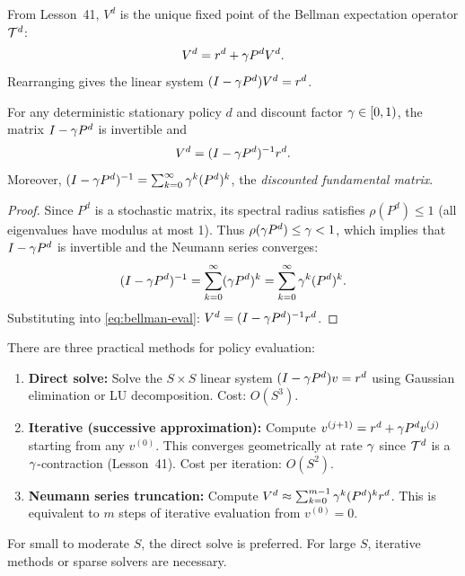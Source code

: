 \documentclass[11pt,a4paper]{article}
\begin{document}
From Lesson~41, $V^d$ is the unique fixed point of the Bellman
expectation operator $\mathcal{T}^d$:
\begin{equation}
\label{eq:bellman-eval}
    V^d = r^d + \gamma P^d V^d.
\end{equation}
Rearranging gives the linear system
$(I - \gamma P^d) V^d = r^d$.

\begin{theorem}
\label{thm:policy-eval-matrix}
For any deterministic stationary policy $d$ and discount factor
$\gamma \in [0,1)$, the matrix $I - \gamma P^d$ is invertible
and
\begin{equation}
\label{eq:policy-eval-closed}
    V^d = (I - \gamma P^d)^{-1} r^d.
\end{equation}
Moreover, $(I - \gamma P^d)^{-1} = \sum_{k=0}^\infty
\gamma^k (P^d)^k$, the \emph{discounted fundamental matrix}.
\end{theorem}

\begin{proof}
Since $P^d$ is a stochastic matrix, its spectral radius satisfies
$\rho(P^d) \leq 1$ (all eigenvalues have modulus at most 1). Thus
$\rho(\gamma P^d) \leq \gamma < 1$, which implies that
$I - \gamma P^d$ is invertible and the Neumann series converges:
\[
    (I - \gamma P^d)^{-1} = \sum_{k=0}^\infty (\gamma P^d)^k
    = \sum_{k=0}^\infty \gamma^k (P^d)^k.
\]
Substituting into \eqref{eq:bellman-eval}:
$V^d = (I - \gamma P^d)^{-1} r^d$.
\end{proof}

\begin{remark}
\label{rem:eval-methods}
There are three practical methods for policy evaluation:
\begin{enumerate}[nosep]
    \item \textbf{Direct solve:} Solve the $S \times S$ linear
    system $(I - \gamma P^d) v = r^d$ using Gaussian elimination
    or LU decomposition. Cost: $O(S^3)$.
    \item \textbf{Iterative (successive approximation):} Compute
    $v^{(j+1)} = r^d + \gamma P^d v^{(j)}$ starting from any
    $v^{(0)}$. This converges geometrically at rate $\gamma$
    since $\mathcal{T}^d$ is a $\gamma$-contraction (Lesson~41).
    Cost per iteration: $O(S^2)$.
    \item \textbf{Neumann series truncation:} Compute
    $V^d \approx \sum_{k=0}^{m-1} \gamma^k (P^d)^k r^d$.
    This is equivalent to $m$ steps of iterative evaluation from
    $v^{(0)} = 0$.
\end{enumerate}
For small to moderate $S$, the direct solve is preferred. For large
$S$, iterative methods or sparse solvers are necessary.
\end{remark}
\end{document}
